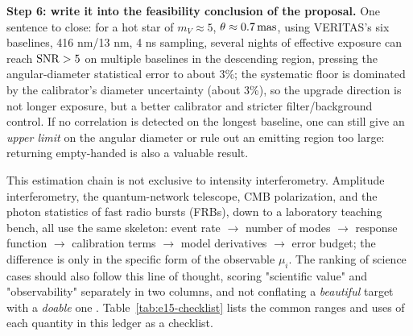 \textbf{Step 6: write it into the feasibility conclusion of the proposal.} One sentence to close: for a hot star of $m_V\approx5$, $\theta\approx0.7\,{\rm mas}$, using VERITAS's six baselines, 416 nm/13 nm, 4 ns sampling, several nights of effective exposure can reach ${\rm SNR}>5$ on multiple baselines in the descending region, pressing the angular-diameter statistical error to about 3\%; the systematic floor is dominated by the calibrator's diameter uncertainty (about 3\%), so the upgrade direction is not longer exposure, but a better calibrator and stricter filter/background control. If no correlation is detected on the longest baseline, one can still give an \emph{upper limit} on the angular diameter or rule out an emitting region too large: returning empty-handed is also a valuable result.

This estimation chain is not exclusive to intensity interferometry. Amplitude interferometry, the quantum-network telescope, CMB polarization, and the photon statistics of fast radio bursts (FRBs), down to a laboratory teaching bench, all use the same skeleton: event rate $\to$ number of modes $\to$ response function $\to$ calibration terms $\to$ model derivatives $\to$ error budget; the difference is only in the specific form of the observable $\mu_i$. The ranking of science cases should also follow this line of thought, scoring "scientific value" and "observability" separately in two columns, and not conflating a \emph{beautiful} target with a \emph{doable} one \citep{2010SPIE.7734E..0AD,2012MNRAS.419..172N,2013APh....43..331D,2022SPIE12183E..0DK}. Table~\ref{tab:e15-checklist} lists the common ranges and uses of each quantity in this ledger as a checklist.

